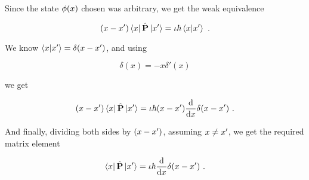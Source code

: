 Since the state $\phi(x)$ chosen was arbitrary,
we get the weak equivalence

\begin{equation}
    (x - x')\bra{x}\hat{\textbf{P}}\ket{x'} =
    \iota \hbar \braket{x}{x'}~.
\end{equation}

We know $\braket{x}{x'} = \delta(x - x')$, and using

\begin{equation}
    \delta(x) = -x\delta'(x)
    \nonumber
\end{equation}

we get

\begin{equation}
    (x - x')\bra{x}\hat{\textbf{P}}\ket{x'} =
    \iota \hbar (x - x') \dv{}{x}
    \delta(x - x')~.
\end{equation}

And finally, dividing both sides by $(x - x')$, assuming
$x \not = x'$, we get the required matrix element

\begin{equation}
    \bra{x}\hat{\textbf{P}}\ket{x'} =
    \iota \hbar \dv{}{x}\delta(x - x')~.
\end{equation}

\begin{flushright}
    \qedsymbol
\end{flushright}

